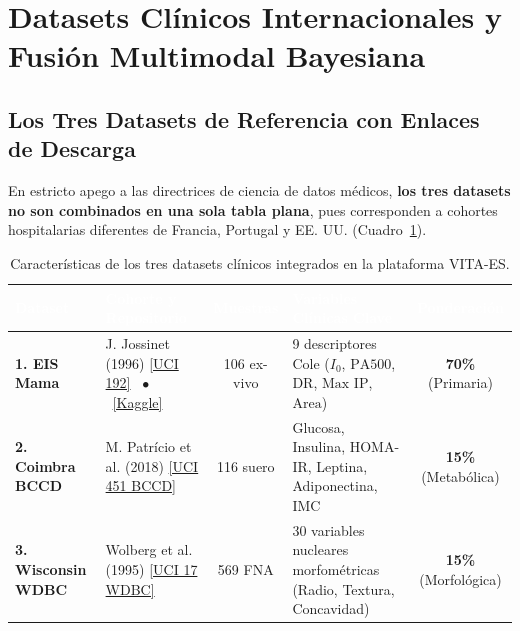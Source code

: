 \documentclass[11pt,a4paper]{article}
\begin{document}
\section{Datasets Clínicos Internacionales y Fusión Multimodal Bayesiana}

\subsection{Los Tres Datasets de Referencia con Enlaces de Descarga}
En estricto apego a las directrices de ciencia de datos médicos, \textbf{los tres datasets no son combinados en una sola tabla plana}, pues corresponden a cohortes hospitalarias diferentes de Francia, Portugal y EE. UU. (Cuadro~\ref{tab:datasets}).

\begin{table}[H]
\centering
\small
\caption{Características de los tres datasets clínicos integrados en la plataforma VITA-ES.}
\label{tab:datasets}
\renewcommand{\arraystretch}{1.28}
\begin{tabularx}{\textwidth}{p{2.6cm} p{3.2cm} c p{4.3cm} c}
\rowcolor{tableheader}
\textcolor{white}{\textbf{Dataset}} & \textcolor{white}{\textbf{Cohorte y Repositorio}} & \textcolor{white}{\textbf{Muestras}} & \textcolor{white}{\textbf{Variables Clínicas Clave}} & \textcolor{white}{\textbf{Ponderación}} \\
\toprule
\textbf{1. EIS Mama} & J. Jossinet (1996) \cite{jossinet1996} \newline \href{https://archive.ics.uci.edu/dataset/192/breast+tissue}{\textcolor{wordsteelblue}{[UCI 192]}} \ $\bullet$ \ \href{https://www.kaggle.com/datasets/tarktunataalt/breast-tissue-impedance-measurements?resource=download}{\textcolor{wordsteelblue}{[Kaggle]}} & 106 ex-vivo & 9 descriptores Cole ($I_0$, $\text{PA500}$, $\text{DR}$, $\text{Max IP}$, $\text{Area}$) & \textbf{70\%} (Primaria) \\
\rowcolor{tablezebra}
\textbf{2. Coimbra BCCD} & M. Patrício et al. (2018) \cite{patricio2018} \newline \href{https://archive.ics.uci.edu/dataset/451/breast+cancer+coimbra}{\textcolor{wordsteelblue}{[UCI 451 BCCD]}} & 116 suero & Glucosa, Insulina, HOMA-IR, Leptina, Adiponectina, IMC & \textbf{15\%} (Metabólica) \\
\textbf{3. Wisconsin WDBC} & Wolberg et al. (1995) \cite{wolberg1995} \newline \href{https://archive.ics.uci.edu/dataset/17/breast+cancer+wisconsin+diagnostic}{\textcolor{wordsteelblue}{[UCI 17 WDBC]}} & 569 FNA & 30 variables nucleares morfométricas (Radio, Textura, Concavidad) & \textbf{15\%} (Morfológica) \\
\bottomrule
\end{tabularx}
\end{table}
\end{document}
